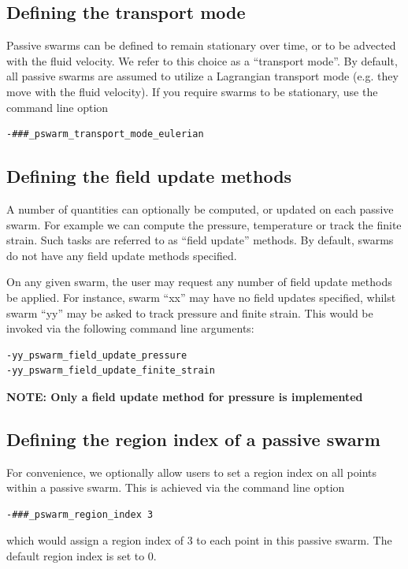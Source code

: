 \documentclass[paper=a4, fontsize=10pt,twoside]{scrartcl}
\begin{document}
{{\subsection{Defining the transport mode}

Passive swarms can be defined to remain stationary over time, or to be advected with the fluid velocity.
We refer to this choice as a ``transport mode''. By default, all passive swarms are assumed to utilize a
Lagrangian transport mode (e.g. they move with the fluid velocity). If you require swarms to be stationary,
use the command line option
\begin{lstlisting}
-###_pswarm_transport_mode_eulerian
\end{lstlisting}

\subsection{Defining the field update methods}

A number of quantities can optionally be computed, or updated on each passive swarm. 
For example we can compute the pressure, temperature or track the finite strain. 
Such tasks are referred to as ``field update'' methods. By default, swarms do not have
any field update methods specified.

On any given swarm, the user may request any number of field update methods be applied. 
For instance, swarm ``xx'' may have no field updates specified, whilst swarm ``yy'' may be
asked to track pressure and finite strain. This would be invoked via the following command
line arguments:
\begin{lstlisting}
-yy_pswarm_field_update_pressure
-yy_pswarm_field_update_finite_strain
\end{lstlisting}

\textbf{NOTE: Only a field update method for pressure is implemented}

\subsection{Defining the region index of a passive swarm}

For convenience, we optionally allow users to set a region index on all points within a passive swarm.
This is achieved via the command line option
\begin{lstlisting} 
-###_pswarm_region_index 3
\end{lstlisting}
which would assign a region index of 3 to each point in this passive swarm. 
The default region index is set to 0.

}}
\end{document}
